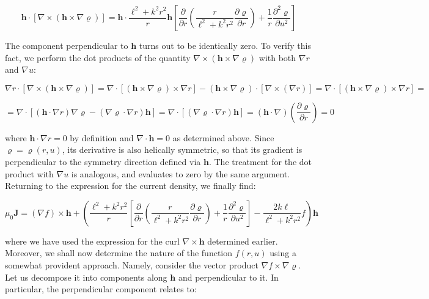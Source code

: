 \begin{equation}
    \mathbf{h}\cdot\left[\nabla\times(\mathbf{h}\times\nabla\varrho)\right]=\mathbf{h}\cdot\frac{\ell^2+k^2r^2}{r}\mathbf{h}\left[\frac{\partial}{\partial r}\left(\frac{r}{\ell^2+k^2r^2}\frac{\partial\varrho}{\partial r}\right)+\frac{1}{r}\frac{\partial^2\varrho}{\partial u^2}\right]
\end{equation}

The component perpendicular to $\mathbf{h}$ turns out to be identically zero. To verify this fact, we perform the dot products of the quantity $\nabla\times(\mathbf{h}\times\nabla\varrho)$ with both $\nabla r$ and $\nabla u$:

\begin{equation*}
    \nabla r\cdot\left[\nabla\times(\mathbf{h}\times\nabla\varrho)\right]=\nabla\cdot\left[(\mathbf{h}\times\nabla\varrho)\times\nabla r\right]-(\mathbf{h}\times\nabla\varrho)\cdot[\nabla\times(\nabla r)]=\nabla\cdot\left[(\mathbf{h}\times\nabla\varrho)\times\nabla r\right]=
\end{equation*}

\begin{equation}
    =\nabla\cdot\left[(\mathbf{h}\cdot\nabla r)\nabla\varrho-(\nabla\varrho\cdot\nabla r)\mathbf{h}\right]=\nabla\cdot\left[(\nabla\varrho\cdot\nabla r)\mathbf{h}\right]=(\mathbf{h}\cdot\nabla)\left(\frac{\partial\varrho}{\partial r}\right)=0
\end{equation}

where $\mathbf{h}\cdot\nabla r=0$ by definition and $\nabla\cdot\mathbf{h}=0$ as determined above. Since $\varrho=\varrho(r,u)$, its derivative is also helically symmetric, so that its gradient is perpendicular to the symmetry direction defined via $\mathbf{h}$. The treatment for the dot product with $\nabla u$ is analogous, and evaluates to zero by the same argument. Returning to the expression for the current density, we finally find:

\begin{equation}
    \label{eq-5-162}
    \mu_0\mathbf{J}=(\nabla f)\times\mathbf{h}+\left(\frac{\ell^2+k^2r^2}{r}\left[\frac{\partial}{\partial r}\left(\frac{r}{\ell^2+k^2r^2}\frac{\partial\varrho}{\partial r}\right)+\frac{1}{r}\frac{\partial^2\varrho}{\partial u^2}\right]-\frac{2k\ell}{\ell^2+k^2r^2}f\right)\mathbf{h}
\end{equation}

where we have used the expression for the curl $\nabla\times\mathbf{h}$ determined earlier. Moreover, we shall now determine the nature of the function $f(r,u)$ using a somewhat provident approach. Namely, consider the vector product $\nabla f\times\nabla\varrho$. Let us decompose it into components along $\mathbf{h}$ and perpendicular to it. In particular, the perpendicular component relates to:

